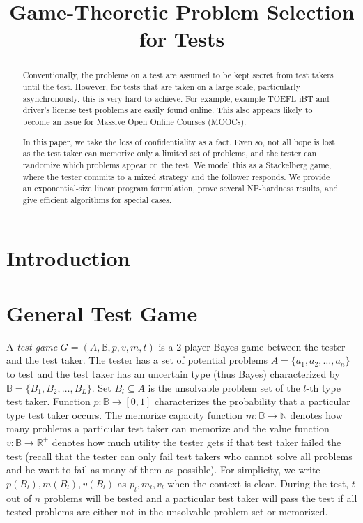 \documentclass{article}
\title{Game-Theoretic Problem Selection for Tests}
\begin{document}
\maketitle

\begin{abstract}
Conventionally, the problems on a test are assumed to be kept secret
from test takers until the test.  However, for tests that are taken on
a large scale, particularly asynchronously, this is very hard to
achieve.  For example, example TOEFL iBT and driver's license test
problems are easily found online.  This also appears likely to become
an issue for Massive Open Online Courses (MOOCs).

In this paper, we take the loss of confidentiality as a fact.  Even
so, not all hope is lost as the test taker can memorize only a limited
set of problems, and the tester can randomize which problems appear on
the test.  We model this as a Stackelberg game, where the tester
commits to a mixed strategy and the follower responds.  We provide an
exponential-size linear program formulation, prove several NP-hardness
results, and give efficient algorithms for special cases.
\end{abstract}

\section{Introduction}

\section{General Test Game}

A \emph{test game} $G = (A, \mathbb B, p, v, m, t)$ is a 2-player Bayes game
between the tester and the test taker. The tester has a set of potential
problems $A = \{a_1, a_2, \ldots, a_n\}$ to test and the test taker has an
uncertain type (thus Bayes) characterized by $\mathbb B = \{B_1, B_2, \ldots,
B_L\}$. Set $B_l \subseteq A$ is the unsolvable problem set of the $l$-th type
test taker.  Function $p: \mathbb B \rightarrow [0,1]$ characterizes the
probability that a particular type test taker occurs.  The memorize capacity
function $m: \mathbb B \rightarrow \mathbb N$ denotes how many problems a
particular test taker can memorize and the value function $v: \mathbb B
\rightarrow \mathbb R^+$ denotes how much utility the tester gets if that test
taker failed the test (recall that the tester can only fail test takers who
cannot solve all problems and he want to fail as many of them as possible). For
simplicity, we write $p(B_l), m(B_l), v(B_l)$ as $p_l, m_l, v_l$ when the
context is clear.  During the test, $t$ out of $n$ problems will be tested and
a particular test taker will pass the test if all tested problems are either
not in the unsolvable problem set or memorized.  
\end{document}
